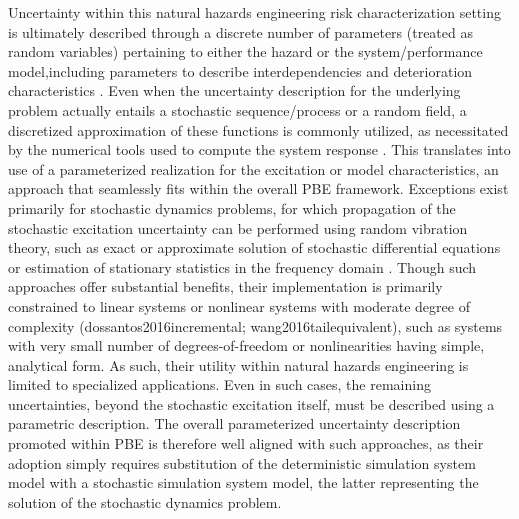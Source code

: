 Uncertainty within this natural hazards engineering risk characterization setting is ultimately described through a discrete number of parameters (treated as random variables) pertaining to either the hazard or the system/performance model,including parameters to describe interdependencies and deterioration characteristics \citep{jia2018statedependent,akiyama2020lifecycle}. Even when the uncertainty description for the underlying problem actually entails a stochastic sequence/process or a random field, a discretized approximation of these functions is commonly utilized, as necessitated by the numerical tools used to compute the system response \citep{gidaris2014surrogate}. This translates into use of a parameterized realization for the excitation or model characteristics, an approach that seamlessly fits within the overall PBE framework. Exceptions exist primarily for stochastic dynamics problems, for which propagation of the stochastic excitation uncertainty can be performed using random vibration theory, such as exact or approximate solution of stochastic differential equations or estimation of stationary statistics in the frequency domain \citep{li2009stochastic}. Though such approaches offer substantial benefits, their implementation is primarily constrained to linear systems or nonlinear systems with moderate degree of complexity (dossantos2016incremental; wang2016tailequivalent), such as systems with very small number of degrees-of-freedom or nonlinearities having simple, analytical form. As such, their utility within natural hazards engineering is limited to specialized applications. Even in such cases, the remaining uncertainties, beyond the stochastic excitation itself, must be described using a parametric description. The overall parameterized uncertainty description promoted within PBE is therefore well aligned with such approaches, as their adoption simply requires substitution of the deterministic simulation system model with a stochastic simulation system model, the latter representing the solution of the stochastic dynamics problem.

